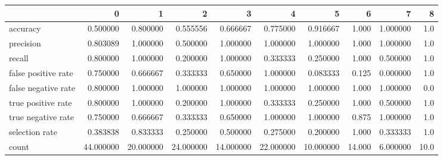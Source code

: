 \begin{tabular}{lrrrrrrrrr}
\toprule
{} &          0 &          1 &          2 &          3 &          4 &          5 &       6 &         7 &     8 \\
\midrule
accuracy            &   0.500000 &   0.800000 &   0.555556 &   0.666667 &   0.775000 &   0.916667 &   1.000 &  1.000000 &   1.0 \\
precision           &   0.803089 &   1.000000 &   0.500000 &   1.000000 &   1.000000 &   1.000000 &   1.000 &  1.000000 &   1.0 \\
recall              &   0.800000 &   1.000000 &   0.200000 &   1.000000 &   0.333333 &   0.250000 &   1.000 &  0.500000 &   1.0 \\
false positive rate &   0.750000 &   0.666667 &   0.333333 &   0.650000 &   1.000000 &   0.083333 &   0.125 &  0.000000 &   1.0 \\
false negative rate &   0.800000 &   1.000000 &   1.000000 &   1.000000 &   1.000000 &   1.000000 &   1.000 &  1.000000 &   0.0 \\
true positive rate  &   0.800000 &   1.000000 &   0.200000 &   1.000000 &   0.333333 &   0.250000 &   1.000 &  0.500000 &   1.0 \\
true negative rate  &   0.750000 &   0.666667 &   0.333333 &   0.650000 &   1.000000 &   1.000000 &   0.875 &  1.000000 &   1.0 \\
selection rate      &   0.383838 &   0.833333 &   0.250000 &   0.500000 &   0.275000 &   0.200000 &   1.000 &  0.333333 &   1.0 \\
count               &  44.000000 &  20.000000 &  24.000000 &  14.000000 &  22.000000 &  10.000000 &  14.000 &  6.000000 &  10.0 \\
\bottomrule
\end{tabular}
